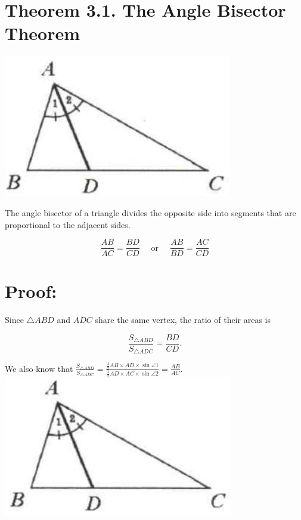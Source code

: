 \documentclass[10pt]{article}
\begin{document}
\section*{Theorem 3.1. The Angle Bisector Theorem}
\begin{center}
\includegraphics[max width=\textwidth]{2025_04_17_97bc1f7e44d93c271a88g-053}
\end{center}

The angle bisector of a triangle divides the opposite side into segments that are proportional to the adjacent sides.

\[
\frac{A B}{A C}=\frac{B D}{C D} \quad \text { or } \quad \frac{A B}{B D}=\frac{A C}{C D}
\]

\section*{Proof:}
Since \(\triangle A B D\) and \(A D C\) share the same vertex, the ratio of their areas is

\[
\frac{S_{\triangle A B D}}{S_{\triangle A D C}}=\frac{B D}{C D} .
\]

We also know that \(\frac{S_{\triangle A B D}}{S_{\triangle A D C}}=\frac{\frac{1}{2} A B \times A D \times \sin \angle 1}{\frac{1}{2} A D \times A C \times \sin \angle 2}=\frac{A B}{A C}\).\\
\includegraphics[max width=\textwidth, center]{2025_04_17_97bc1f7e44d93c271a88g-053(1)}
\end{document}
